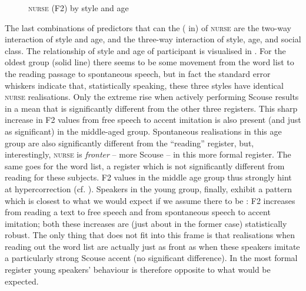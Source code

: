 \begin{figure}
	
		\resizebox{0.5\linewidth}{!}{} 
	\caption{\textsc{nurse} (F2) by style and age}
	\label{fig.line.f2.nurse.tot}
\end{figure}

The last combinations of predictors that can  the ( in)  of \textsc{nurse} are the two-way interaction of style and age, and the three-way interaction of style, age, and social class.
The relationship of style and age of participant is visualised in .
For the oldest group (solid line) there seems to be some movement from the word list to the reading passage to spontaneous speech, but in fact the standard error whiskers indicate that, statistically speaking, these three styles have identical \textsc{nurse} realisations.
Only the extreme rise when actively performing Scouse results in a mean that is significantly different from the other three registers.
This sharp increase in F2 values from free speech to accent imitation is also present (and just as significant) in the middle-aged group.
Spontaneous realisations in this age group are also significantly different from the ``reading'' register, but, interestingly, \textsc{nurse} is \emph{fronter} -- more Scouse -- in this more formal register.
The same goes for the word list, a register which is not significantly different from reading for these subjects.
F2 values in the middle age group thus strongly hint at hypercorrection (cf. ).
Speakers in the young group, finally, exhibit a pattern which is closest to what we would expect if we assume there to be : F2 increases from reading a text to free speech and from spontaneous speech to accent imitation; both these increases are (just about in the former case) statistically robust.
The only thing that does not fit into this frame is that realisations when reading out the word list are actually just as front as when these speakers imitate a particularly strong Scouse accent (no significant difference).
In the most formal register young speakers' behaviour is therefore opposite to what would be expected.

